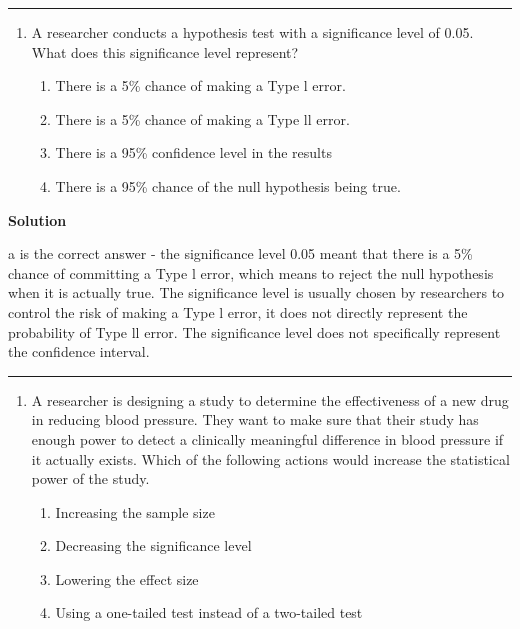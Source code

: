 \documentclass[
  letterpaper,
  DIV=11,
  numbers=noendperiod,
  oneside]{scrreprt}
\providecommand{\tightlist}{%
  \setlength{\itemsep}{0pt}\setlength{\parskip}{0pt}}\usepackage{longtable,booktabs,array}
\begin{document}
\begin{center}\rule{0.5\linewidth}{0.5pt}\end{center}

\begin{enumerate}
\def\labelenumi{\arabic{enumi}.}
\setcounter{enumi}{2}
\tightlist
\item
  A researcher conducts a hypothesis test with a significance level of
  0.05. What does this significance level represent?

  \begin{enumerate}
  \def\labelenumii{\alph{enumii}.}
  \tightlist
  \item
    There is a 5\% chance of making a Type l error.
  \item
    There is a 5\% chance of making a Type ll error.
  \item
    There is a 95\% confidence level in the results
  \item
    There is a 95\% chance of the null hypothesis being true.
  \end{enumerate}
\end{enumerate}

\textbf{Solution}

a is the correct answer - the significance level 0.05 meant that there
is a 5\% chance of committing a Type l error, which means to reject the
null hypothesis when it is actually true. The significance level is
usually chosen by researchers to control the risk of making a Type l
error, it does not directly represent the probability of Type ll error.
The significance level does not specifically represent the confidence
interval.

\begin{center}\rule{0.5\linewidth}{0.5pt}\end{center}

\begin{enumerate}
\def\labelenumi{\arabic{enumi}.}
\setcounter{enumi}{3}
\tightlist
\item
  A researcher is designing a study to determine the effectiveness of a
  new drug in reducing blood pressure. They want to make sure that their
  study has enough power to detect a clinically meaningful difference in
  blood pressure if it actually exists. Which of the following actions
  would increase the statistical power of the study.

  \begin{enumerate}
  \def\labelenumii{\alph{enumii}.}
  \tightlist
  \item
    Increasing the sample size
  \item
    Decreasing the significance level
  \item
    Lowering the effect size
  \item
    Using a one-tailed test instead of a two-tailed test
  \end{enumerate}
\end{enumerate}
\end{document}
